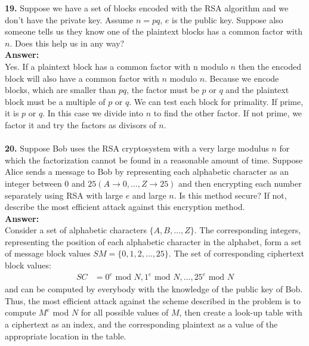 \documentclass[paper=a4, fontsize=11pt]{scrartcl} %
\numberwithin{equation}{section} %
\numberwithin{figure}{section} %
\numberwithin{table}{section} %
\begin{document}
 \textbf{19.} Suppose we have a set of blocks encoded with the RSA algorithm and we don't have the private key. Assume $n = pq$, $e$ is the public key. Suppose also someone tells us they know one of the plaintext blocks has a common factor with $n$. Does this help us in any way?\\

 \textbf{Answer:}\\
 
 Yes. If a plaintext block has a common factor with n modulo $n$ then the encoded block will also have a common factor with $n$ modulo $n$. Because we encode blocks, which are smaller than $pq$, the factor must be $p$ or $q$ and the plaintext block must be a multiple of $p$ or $q$. We can test each block for primality. If prime, it is $p$ or $q$. In this case we divide into $n$ to find the other factor. If not prime, we factor it and try the factors as divisors of $n$.\\ \\




 \textbf{20.} Suppose Bob uses the RSA cryptosystem with a very large modulus $n$ for which the factorization cannot be found in a reasonable amount of time. Suppose Alice sends a message to Bob by representing each alphabetic character as an integer between $0$ and $25(A\rightarrow0,\ldots, Z\rightarrow25)$ and then encrypting each number separately using RSA with large $e$ and large $n$. Is this method secure? If not, describe the most efficient attack against this encryption method.\\

 \textbf{Answer:}\\
 
 Consider a set of alphabetic characters $\{A, B,\ldots, Z\}$. The corresponding integers, representing the position of each alphabetic character in the alphabet, form a set of message block values $SM = \{0, 1, 2,\ldots, 25\}$. The set of corresponding ciphertext block values: 
 \begin{align}
 SC &= {0^{e} \text{ mod } N, 1^{e}\text{ mod } N, \ldots, 25^{e} \text{ mod } N}
 \end{align}
 and can be computed by everybody with the knowledge of the public key of Bob.\\
 Thus, the most efficient attack against the scheme described in the problem is to compute $M^{e}$ mod $N$ for all possible values of $M$, then create a look-up table with a ciphertext as an index, and the corresponding plaintext as a value of the appropriate location in the table.
\end{document}

